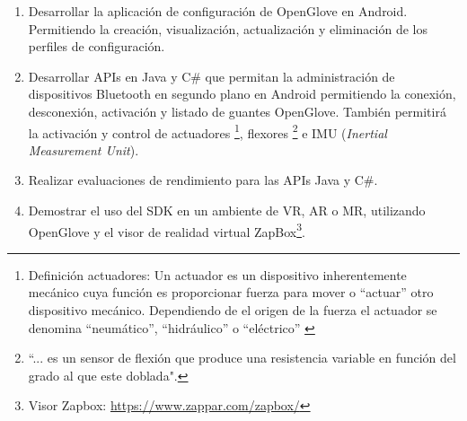 \begin{enumerate}
\item Desarrollar la aplicación de configuración de OpenGlove en Android. Permitiendo la creación, visualización, actualización y eliminación de los perfiles de configuración.

\item Desarrollar APIs en Java y C\# que permitan la administración de dispositivos Bluetooth en segundo plano en Android permitiendo la conexión, desconexión, activación y listado de guantes OpenGlove.  También permitirá la activación y control de actuadores \footnote{Definición actuadores: Un actuador es un dispositivo inherentemente mecánico cuya función es proporcionar fuerza para mover o “actuar” otro dispositivo mecánico. Dependiendo de el origen de la fuerza el actuador se denomina ``neumático'', ``hidráulico'' o ``eléctrico'' \citep{actuadores}}, flexores \footnote{  ``... es un sensor de flexión que produce una resistencia variable en función del grado al que este doblada".\citep{flexor-sensor-01}} e IMU (\textit{Inertial Measurement Unit}).


\item Realizar evaluaciones de rendimiento para las APIs Java y C\#.

\item Demostrar el uso del SDK en un ambiente de VR, AR o MR, utilizando OpenGlove y el visor de realidad virtual ZapBox\footnote{Visor Zapbox: \url{https://www.zappar.com/zapbox/}}.
\end{enumerate}


